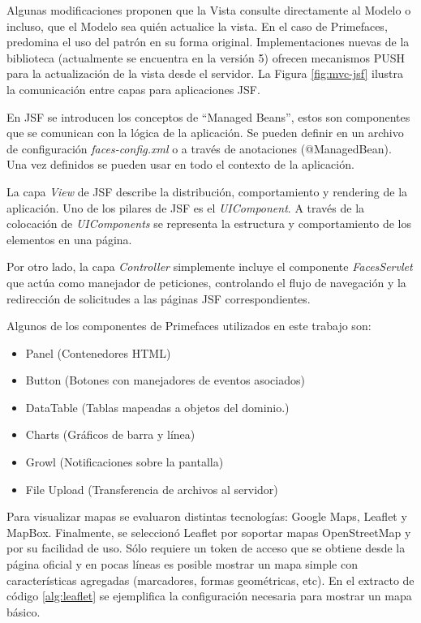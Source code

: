  Algunas modificaciones proponen que la Vista consulte directamente al Modelo o incluso, que el Modelo sea quién actualice la vista. En el caso de Primefaces, predomina el uso del patrón en su forma original. Implementaciones nuevas de la biblioteca (actualmente se encuentra en la versión 5) ofrecen mecanismos PUSH para la actualización de la vista desde el servidor. La Figura \ref{fig:mvc-jsf} ilustra la comunicación entre capas para aplicaciones JSF.
 
 En JSF se introducen los conceptos de ``Managed Beans'', estos son componentes que se comunican con la lógica de la aplicación. Se pueden definir en un archivo de configuración \textit{faces-config.xml} o a través de anotaciones (@ManagedBean). Una vez definidos se pueden usar en todo el contexto de la aplicación.
 
 La capa \textit{View} de JSF describe la distribución, comportamiento y rendering de la aplicación. Uno de los pilares de JSF es el \textit{UIComponent}. A través de la colocación de \textit{UIComponents} se representa la estructura y comportamiento de los elementos en una página.
 
 Por otro lado, la capa \textit{Controller} simplemente incluye el componente \textit{FacesServlet} que actúa como manejador de peticiones, controlando el flujo de navegación y la redirección de solicitudes a las páginas JSF correspondientes.
 
 Algunos de los componentes de Primefaces utilizados en este trabajo son:
 
 \begin{itemize}
    \item Panel (Contenedores HTML)
    \item Button (Botones con manejadores de eventos asociados)
    \item DataTable (Tablas mapeadas a objetos del dominio.)
    \item Charts (Gráficos de barra y línea)
    \item Growl (Notificaciones sobre la pantalla)
    \item File Upload (Transferencia de archivos al servidor)
 \end{itemize}
 
 Para visualizar mapas se evaluaron distintas tecnologías: Google Maps, Leaflet y MapBox. Finalmente, se seleccionó Leaflet por soportar mapas OpenStreetMap y por su facilidad de uso. Sólo requiere un token de acceso que se obtiene desde la página oficial y en pocas líneas es posible mostrar un mapa simple con características agregadas (marcadores, formas geométricas, etc). En el extracto de código \ref{alg:leaflet} se ejemplifica la configuración necesaria para mostrar un mapa básico.
 

